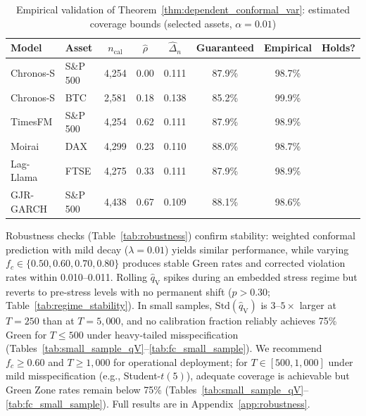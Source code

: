 \documentclass[preprint,11pt,authoryear]{elsarticle}
\newcommand{\1}{\boldsymbol{1}}
\newcommand{\qV}{\hat{q}_{\scriptscriptstyle\mathrm{V}}}
\begin{document}
	\begin{table}[H]
		\centering
		\caption{Empirical validation of Theorem~\ref{thm:dependent_conformal_var}: estimated coverage bounds (selected assets, $\alpha=0.01$)}
		\label{tab:delta_n}
		\small
		\begin{tabular}{@{}llcccccc@{}}
			\toprule
			Model & Asset & $n_{\mathrm{cal}}$ & $\hat\rho$ & $\hat\Delta_n$ & Guaranteed & Empirical & Holds? \\
			\midrule
			Chronos-S & S\&P 500 & 4{,}254 & 0.00 & 0.111 & 87.9\% & 98.7\% & \checkmark \\
			Chronos-S & BTC      & 2{,}581 & 0.18 & 0.138 & 85.2\% & 99.9\% & \checkmark \\
			TimesFM   & S\&P 500 & 4{,}254 & 0.62 & 0.111 & 87.9\% & 98.9\% & \checkmark \\
			Moirai    & DAX      & 4{,}299 & 0.23 & 0.110 & 88.0\% & 98.7\% & \checkmark \\
			Lag-Llama & FTSE     & 4{,}275 & 0.33 & 0.111 & 87.9\% & 98.9\% & \checkmark \\
			GJR-GARCH & S\&P 500 & 4{,}438 & 0.67 & 0.109 & 88.1\% & 98.6\% & \checkmark \\
			\bottomrule
		\end{tabular}
	\end{table}
	
	Robustness checks (Table~\ref{tab:robustness}) confirm
	stability: weighted conformal prediction with mild decay
	($\lambda = 0.01$) yields similar performance, while varying
	$f_c \in \{0.50, 0.60, 0.70, 0.80\}$ produces stable Green
	rates and corrected violation rates within 0.010--0.011.
	Rolling $\qV$ spikes during an embedded stress regime but
	reverts to pre-stress levels with no permanent shift
	($p > 0.30$; Table~\ref{tab:regime_stability}). In small
	samples, $\text{Std}(\qV)$ is $3$--$5\times$ larger at
	$T = 250$ than at $T = 5{,}000$, and no calibration fraction
	reliably achieves 75\% Green for $T \leq 500$ under
	heavy-tailed misspecification
	(Tables~\ref{tab:small_sample_qV}--\ref{tab:fc_small_sample}).
	We recommend $f_c \geq 0.60$ and $T \geq 1{,}000$ for operational
	deployment; for $T \in [500, 1{,}000]$ under mild misspecification
	(e.g., Student-$t(5)$), adequate coverage is achievable but Green
	Zone rates remain below 75\%
	(Tables~\ref{tab:small_sample_qV}--\ref{tab:fc_small_sample}).
	Full results are in Appendix~\ref{app:robustness}.
	
	
\end{document}
